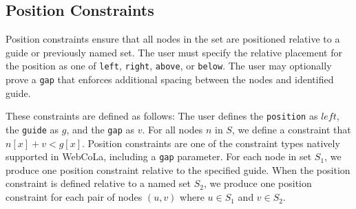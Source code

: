 


\subsection{Position Constraints}
Position constraints ensure that all nodes in the set are positioned relative to
a guide or previously named set. The user must specify the relative
placement for the position as one of \texttt{left}, \texttt{right}, 
\texttt{above}, or \texttt{below}.
The user may optionally prove a \texttt{gap} that enforces additional spacing
between the nodes and identified guide.

These constraints are defined as follows: The user defines the \texttt{position} as $left$,
the \texttt{guide} as $g$, and the \texttt{gap} as $v$. For all nodes $n$
in $S$, we define a constraint that $n[x] + v < g[x]$.
Position constraints are one of the constraint types natively supported in
WebCoLa, including a \texttt{gap} parameter. For each node
in set $S_1$, we produce one position constraint relative to the specified guide.
When the position constraint is defined relative to a named set $S_2$,
we produce one position constraint for each pair of nodes $(u, v)$ where $u \in S_1$ and $v \in S_2$.

